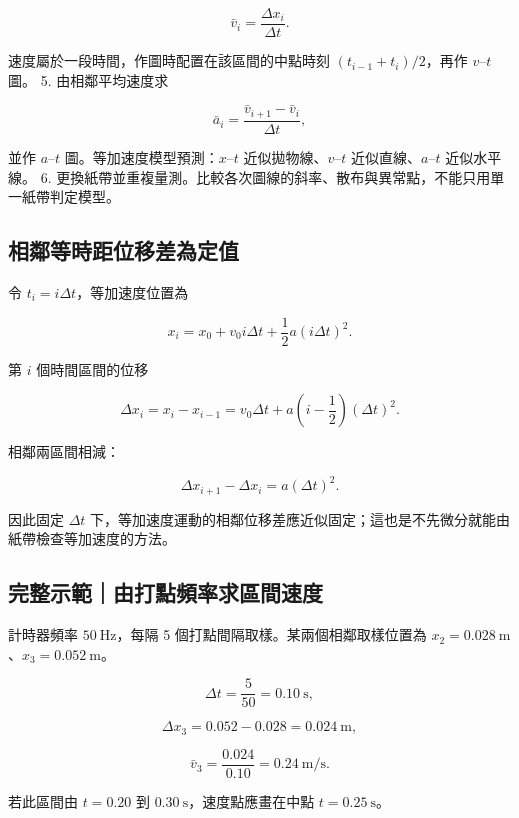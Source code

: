 \documentclass[11pt,a4paper]{article}
\begin{document}
\[
\bar v_i=\frac{\Delta x_i}{\Delta t}.
\]

速度屬於一段時間，作圖時配置在該區間的中點時刻 \((t_{i-1}+t_i)/2\)，再作 \(v\text{–}t\) 圖。
5. 由相鄰平均速度求

\[
\bar a_i=\frac{\bar v_{i+1}-\bar v_i}{\Delta t},
\]

並作 \(a\text{–}t\) 圖。等加速度模型預測：\(x\text{–}t\) 近似拋物線、\(v\text{–}t\) 近似直線、\(a\text{–}t\) 近似水平線。
6. 更換紙帶並重複量測。比較各次圖線的斜率、散布與異常點，不能只用單一紙帶判定模型。

\subsection{相鄰等時距位移差為定值}\label{ux76f8ux9130ux7b49ux6642ux8dddux4f4dux79fbux5deeux70baux5b9aux503c}

令 \(t_i=i\Delta t\)，等加速度位置為

\[
x_i=x_0+v_0i\Delta t+\frac12a(i\Delta t)^2.
\]

第 \(i\) 個時間區間的位移

\[
\Delta x_i=x_i-x_{i-1}
=v_0\Delta t+a\left(i-\frac12\right)(\Delta t)^2.
\]

相鄰兩區間相減：

\[
\boxed{\Delta x_{i+1}-\Delta x_i=a(\Delta t)^2}.
\]

因此固定 \(\Delta t\) 下，等加速度運動的相鄰位移差應近似固定；這也是不先微分就能由紙帶檢查等加速度的方法。

\begin{HandoutWorkedExample}

\subsection{完整示範｜由打點頻率求區間速度}\label{ux5b8cux6574ux793aux7bc4ux7531ux6253ux9edeux983bux7387ux6c42ux5340ux9593ux901fux5ea6}

計時器頻率 \(50\ \mathrm{Hz}\)，每隔 5 個打點間隔取樣。某兩個相鄰取樣位置為 \(x_2=0.028\ \mathrm m\)、\(x_3=0.052\ \mathrm m\)。

\[
\Delta t=\frac5{50}=0.10\ \mathrm s,
\]

\[
\Delta x_3=0.052-0.028=0.024\ \mathrm m,
\]

\[
\bar v_3=\frac{0.024}{0.10}=0.24\ \mathrm{m/s}.
\]

若此區間由 \(t=0.20\) 到 \(0.30\ \mathrm s\)，速度點應畫在中點 \(t=0.25\ \mathrm s\)。

\end{HandoutWorkedExample}
\end{document}
